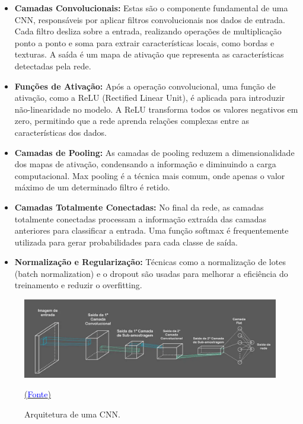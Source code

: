 \begin{itemize}
    \item \textbf{Camadas Convolucionais:}  
    Estas são o componente fundamental de uma CNN, responsáveis por aplicar filtros convolucionais nos dados de entrada. Cada filtro desliza sobre a entrada, realizando operações de multiplicação ponto a ponto e soma para extrair características locais, como bordas e texturas. A saída é um mapa de ativação que representa as características detectadas pela rede.

    \item \textbf{Funções de Ativação:}  
    Após a operação convolucional, uma função de ativação, como a ReLU (Rectified Linear Unit), é aplicada para introduzir não-linearidade no modelo. A ReLU transforma todos os valores negativos em zero, permitindo que a rede aprenda relações complexas entre as características dos dados.

    \item \textbf{Camadas de Pooling:}  
    As camadas de pooling reduzem a dimensionalidade dos mapas de ativação, condensando a informação e diminuindo a carga computacional. Max pooling é a técnica mais comum, onde apenas o valor máximo de um determinado filtro é retido.

    \item \textbf{Camadas Totalmente Conectadas:}  
    No final da rede, as camadas totalmente conectadas processam a informação extraída das camadas anteriores para classificar a entrada. Uma função softmax é frequentemente utilizada para gerar probabilidades para cada classe de saída.

    \item \textbf{Normalização e Regularização:}  
    Técnicas como a normalização de lotes (batch normalization) e o dropout são usadas para melhorar a eficiência do treinamento e reduzir o overfitting.
\end{itemize}
\clearpage
  \begin{figure}
    \centering
    \includegraphics[width=1\linewidth]{cnn.png}
    \caption{Arquitetura de uma CNN.} \protect\href{https://vitorborbarodrigues.medium.com/conhecendo-a-vis%C3%A3o-do-computador-redes-neurais-convolucionais-e1c2b14bf426}{(\textcolor{blue}{Fonte})}
    \label{fig:cnn}
\end{figure}


